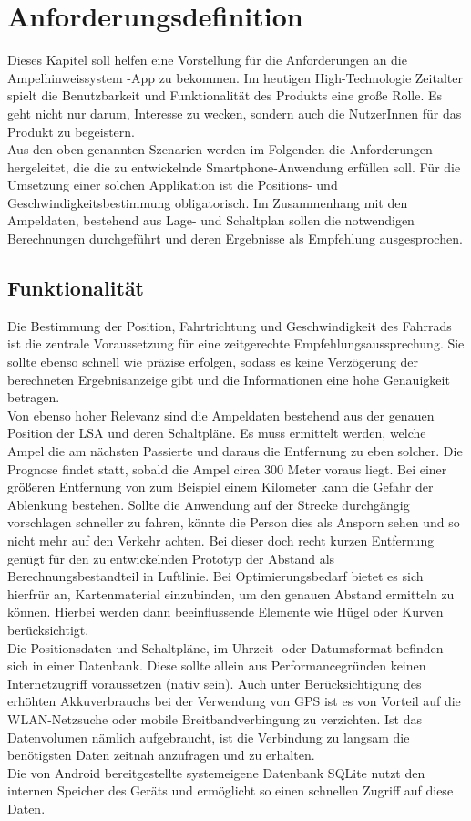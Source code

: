 \chapter{Anforderungsdefinition}
Dieses Kapitel soll helfen eine Vorstellung für die Anforderungen an die Ampelhinweissystem -App zu bekommen. Im heutigen High-Technologie Zeitalter spielt die Benutzbarkeit und Funktionalität des Produkts eine große Rolle. Es geht nicht nur darum, Interesse zu wecken, sondern auch die NutzerInnen für das Produkt zu begeistern. \\
Aus den oben genannten Szenarien werden im Folgenden die Anforderungen hergeleitet, die die zu entwickelnde \gls{Smartphone}-Anwendung erfüllen soll. Für die Umsetzung einer solchen Applikation ist die Positions- und Geschwindigkeitsbestimmung obligatorisch. Im Zusammenhang mit den Ampeldaten, bestehend aus Lage- und Schaltplan sollen die notwendigen Berechnungen durchgeführt und deren Ergebnisse als Empfehlung ausgesprochen.
\section{Funktionalität}
Die Bestimmung der Position, Fahrtrichtung und Geschwindigkeit des Fahrrads ist die zentrale Voraussetzung für eine zeitgerechte Empfehlungsaussprechung. Sie sollte ebenso schnell wie präzise erfolgen, sodass es keine Verzögerung der berechneten Ergebnisanzeige gibt und die Informationen eine hohe Genauigkeit betragen. \\
Von ebenso hoher Relevanz sind die Ampeldaten bestehend aus der genauen Position der \gls{LSA} und deren Schaltpläne. Es muss ermittelt werden, welche Ampel die am nächsten Passierte und daraus die Entfernung zu eben solcher. Die Prognose findet statt, sobald die Ampel circa 300 Meter voraus liegt. Bei einer größeren Entfernung von zum Beispiel einem Kilometer kann die Gefahr der Ablenkung bestehen. Sollte die Anwendung auf der Strecke durchgängig vorschlagen schneller zu fahren, könnte die Person dies als Ansporn sehen und so nicht mehr auf den Verkehr achten. Bei dieser doch recht kurzen Entfernung genügt für den zu entwickelnden Prototyp der Abstand als Berechnungsbestandteil in Luftlinie. Bei Optimierungsbedarf bietet es sich hierfrür an, Kartenmaterial einzubinden, um den genauen Abstand ermitteln zu können. Hierbei werden dann beeinflussende Elemente wie Hügel oder Kurven berücksichtigt.\\
Die Positionsdaten und Schaltpläne, im Uhrzeit- oder Datumsformat befinden sich in einer Datenbank. Diese sollte allein aus Performancegründen keinen Internetzugriff voraussetzen (nativ sein). Auch unter Berücksichtigung des erhöhten Akkuverbrauchs bei der Verwendung von \gls{GPS} ist es von Vorteil auf die \gls{WLAN}-Netzsuche oder mobile Breitbandverbingung zu verzichten. Ist das Datenvolumen nämlich aufgebraucht, ist die Verbindung zu langsam die benötigsten Daten zeitnah anzufragen und zu erhalten.\\ 
Die von Android bereitgestellte systemeigene Datenbank \gls{SQLite} nutzt den internen Speicher des Geräts und ermöglicht so einen schnellen Zugriff auf diese Daten.
